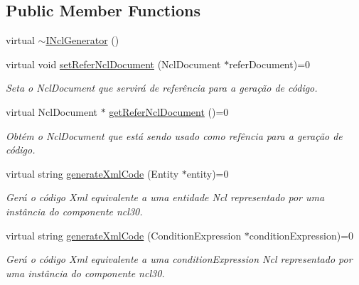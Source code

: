 \subsection*{Public Member Functions}
\begin{DoxyCompactItemize}
\item 
virtual \hyperlink{classbr_1_1ufscar_1_1lince_1_1ncl_1_1generator_1_1INclGenerator_af2769de79864c1ddc43121cc6e4359a8}{$\sim$INclGenerator} ()
\item 
virtual void \hyperlink{classbr_1_1ufscar_1_1lince_1_1ncl_1_1generator_1_1INclGenerator_aa6efc869c5838051c86741ce73babe4e}{setReferNclDocument} (NclDocument $\ast$referDocument)=0
\begin{DoxyCompactList}\small\item\em Seta o NclDocument que servirá de referência para a geração de código. \item\end{DoxyCompactList}\item 
virtual NclDocument $\ast$ \hyperlink{classbr_1_1ufscar_1_1lince_1_1ncl_1_1generator_1_1INclGenerator_ae351bae817561b66e20e5442d49a17e0}{getReferNclDocument} ()=0
\begin{DoxyCompactList}\small\item\em Obtém o NclDocument que está sendo usado como refência para a geração de código. \item\end{DoxyCompactList}\item 
virtual string \hyperlink{classbr_1_1ufscar_1_1lince_1_1ncl_1_1generator_1_1INclGenerator_ab15f1ff3a96439e2a33427c7df5d9988}{generateXmlCode} (Entity $\ast$entity)=0
\begin{DoxyCompactList}\small\item\em Gerá o código Xml equivalente a uma entidade Ncl representado por uma instância do componente ncl30. \item\end{DoxyCompactList}\item 
virtual string \hyperlink{classbr_1_1ufscar_1_1lince_1_1ncl_1_1generator_1_1INclGenerator_aa03215531edbb0cc50097b2f6de3eda9}{generateXmlCode} (ConditionExpression $\ast$conditionExpression)=0
\begin{DoxyCompactList}\small\item\em Gerá o código Xml equivalente a uma conditionExpression Ncl representado por uma instância do componente ncl30. \item\end{DoxyCompactList}\item 

\end{DoxyCompactItemize}
